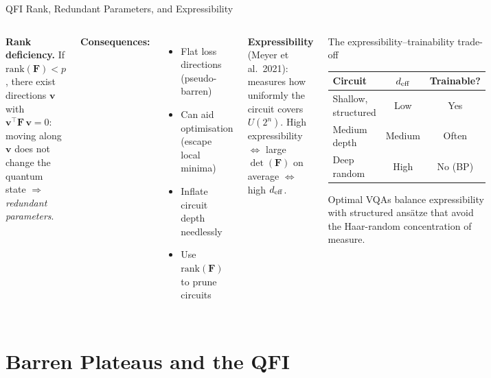 \documentclass[aspectratio=169,10pt]{beamer}
\newcommand{\QFI}{\mathbf{F}}
\begin{document}
\begin{frame}{QFI Rank, Redundant Parameters, and Expressibility}
  \begin{columns}[T]
    \textbf{Rank deficiency.}
    If $\mathrm{rank}(\QFI)<p$, there exist directions
    $\mathbf{v}$ with $\mathbf{v}^\top\QFI\,\mathbf{v}=0$:
    moving along $\mathbf{v}$ does not change the quantum state
    $\Rightarrow$ \emph{redundant parameters}.

    \medskip
    \textbf{Consequences:}
    \begin{itemize}\itemsep2pt
      \item Flat loss directions (pseudo-barren)
      \item Can aid optimisation (escape local minima)
      \item Inflate circuit depth needlessly
      \item Use $\mathrm{rank}(\QFI)$ to prune circuits
    \end{itemize}

    \medskip
    \textbf{Expressibility} (Meyer et al.\ 2021):
    measures how uniformly the circuit covers $U(2^n)$.
    High expressibility $\Leftrightarrow$ large
    $\det(\QFI)$ on average $\Leftrightarrow$ high $d_{\rm eff}$.
    \begin{alertblock}{The expressibility--trainability trade-off}
      \begin{center}
      \begin{tabular}{lcc}
        \toprule
        Circuit & $d_{\rm eff}$ & Trainable? \\
        \midrule
        Shallow, structured & Low & Yes \\
        Medium depth & Medium & Often \\
        Deep random & High & No (BP) \\
        \bottomrule
      \end{tabular}
      \end{center}
      Optimal VQAs balance expressibility with
      structured ans\"{a}tze that avoid the
      Haar-random concentration of measure.
    \end{alertblock}
  \end{columns}
\end{frame}

\section{Barren Plateaus and the QFI}
\end{document}
